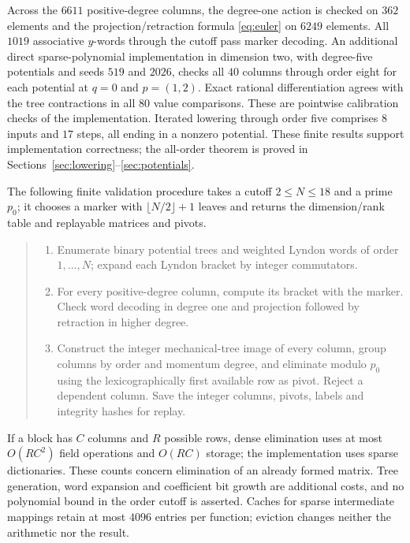 \documentclass[11pt]{article}
\begin{document}
Across the $6611$ positive-degree columns, the degree-one action is checked
on $362$ elements and the projection/retraction formula
\eqref{eq:euler} on $6249$ elements. All $1019$ associative $y$-words through
the cutoff pass marker decoding. An additional direct sparse-polynomial
implementation in dimension two, with degree-five potentials and seeds
$519$ and $2026$, checks all $40$ columns through order eight for each
potential at $q=0$ and $p=(1,2)$. Exact rational differentiation agrees with
the tree contractions in all $80$ value comparisons. These are pointwise
calibration checks of the implementation. Iterated lowering through order five comprises
$8$ inputs and $17$ steps, all ending in a nonzero potential. These finite
results support implementation correctness; the all-order theorem is proved
in Sections~\ref{sec:lowering}--\ref{sec:potentials}.

The following finite validation procedure takes a cutoff $2\le N\le18$ and a prime
$p_0$; it chooses a marker with $\lfloor N/2\rfloor+1$ leaves and returns
the dimension/rank table and replayable matrices and pivots.
\begin{quote}
\begin{enumerate}
\item Enumerate binary potential trees and weighted Lyndon words of order
$1,\ldots,N$; expand each Lyndon bracket by integer commutators.
\item For every positive-degree column, compute its bracket with the marker.
Check word decoding in degree one and projection followed by retraction in
higher degree.
\item Construct the integer mechanical-tree image of every column, group
columns by order and momentum degree, and eliminate modulo $p_0$ using the
lexicographically first available row as pivot. Reject a dependent column.
Save the integer columns, pivots, labels and integrity hashes for replay.
\end{enumerate}
\end{quote}
If a block
has $C$ columns and $R$ possible rows, dense elimination uses at most
$O(RC^2)$ field operations and $O(RC)$ storage; the implementation uses
sparse dictionaries. These counts concern elimination of an already formed
matrix. Tree generation, word expansion and coefficient bit growth are
additional costs, and no polynomial bound in the order cutoff is asserted.
Caches for sparse intermediate mappings retain at most $4096$ entries per
function; eviction changes neither the arithmetic nor the result.
\end{document}
